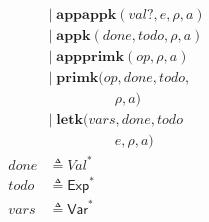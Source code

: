 \documentclass[12pt,draft]{article}
\begin{document}
{\begin{multicols*}{2}
\begin{center}
\begin{align*}
        &|\; \textbf{appappk}(val?, e, \rho, a) \\
        &|\; \textbf{appk}(done, todo, \rho, a) \\
        &|\; \textbf{appprimk}(op, \rho, a) \\
        &|\; \textbf{primk}(op, done, todo, \\
        &\;\;\;\;\;\;\;\;\;\;\;\;\;\;\;\;\;\rho, a) \\
        &|\; \textbf{letk}(vars, done, todo \\
        &\;\;\;\;\;\;\;\;\;\;\;\;\;\;\;\;\;e, \rho, a) \\
done &\triangleq \textit{Val}^\ast \\
todo &\triangleq \textsf{Exp}^* \\
vars &\triangleq \textsf{Var}^*
\end{align*}
\end{center}
\end{multicols*}
}

\newpage
\end{document}
